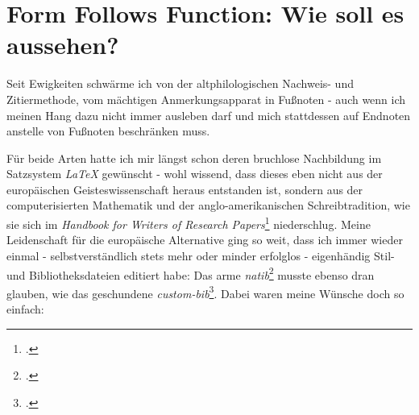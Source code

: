 %
%
%
%
%
\section{Form Follows Function: Wie soll es aussehen?}

Seit Ewigkeiten schwärme ich von der altphilologischen Nachweis- und
Zitiermethode, vom mächtigen Anmerkungsapparat in Fußnoten - auch wenn ich
meinen Hang dazu nicht immer ausleben darf und mich stattdessen auf Endnoten
anstelle von Fußnoten beschränken muss.

Für beide Arten hatte ich mir längst schon deren bruchlose Nachbildung im
Satzsystem \emph{LaTeX} gewünscht - wohl wissend, dass dieses eben nicht aus der
europäischen Geisteswissenschaft heraus entstanden ist, sondern aus der
computerisierten Mathematik und der anglo-amerikanischen Schreibtradition, wie
sie sich im \textit{Handbook for Writers of Research
Papers}\footcite[vgl.][]{ModLanAss2009a} niederschlug. Meine Leidenschaft für
die europäische Alternative ging so weit, dass ich immer wieder einmal -
selbstverständlich stets mehr oder minder erfolglos - eigenhändig Stil- und
Bibliotheksdateien editiert habe: Das arme
\emph{natib}\footcite[vgl.][]{Daly2000a} musste ebenso dran glauben, wie das
geschundene \emph{custom-bib}\footcite[vgl.][]{Daly2007a}. Dabei waren meine
Wünsche doch so einfach:

